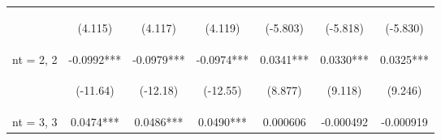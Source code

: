 \documentclass[]{article}
\begin{document}
\begin{center}
\begin{tabular}{lcccccc}
        \vspace{4pt}     & \begin{footnotesize}(4.115)\end{footnotesize}  & \begin{footnotesize}(4.117)\end{footnotesize}  & \begin{footnotesize}(4.119)\end{footnotesize}  & \begin{footnotesize}(-5.803)\end{footnotesize} & \begin{footnotesize}(-5.818)\end{footnotesize} & \begin{footnotesize}(-5.830)\end{footnotesize} \\
        nt = 2, 2        & -0.0992***                                     & -0.0979***                                     & -0.0974***                                     & 0.0341***                                      & 0.0330***                                      & 0.0325***                                      \\
        \vspace{4pt}     & \begin{footnotesize}(-11.64)\end{footnotesize} & \begin{footnotesize}(-12.18)\end{footnotesize} & \begin{footnotesize}(-12.55)\end{footnotesize} & \begin{footnotesize}(8.877)\end{footnotesize}  & \begin{footnotesize}(9.118)\end{footnotesize}  & \begin{footnotesize}(9.246)\end{footnotesize}  \\
        nt = 3, 3        & 0.0474***                                      & 0.0486***                                      & 0.0490***                                      & 0.000606                                       & -0.000492                                      & -0.000919                                      \\

\end{tabular}
\end{center}
\end{document}
